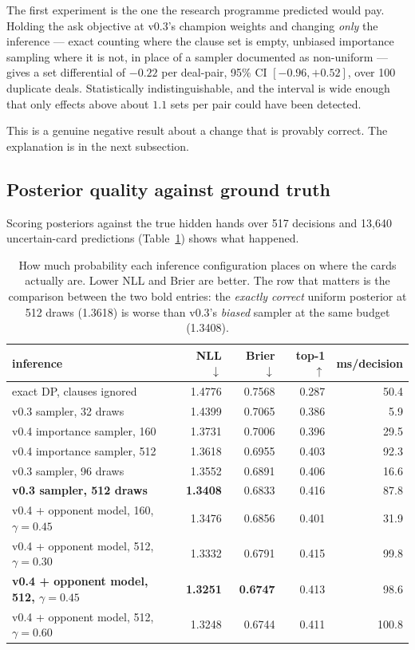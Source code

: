 \documentclass[11pt,a4paper]{article}
\begin{document}
The first experiment is the one the research programme predicted would pay.
Holding the ask objective at v0.3's champion weights and changing \emph{only}
the inference --- exact counting where the clause set is empty, unbiased
importance sampling where it is not, in place of a sampler documented as
non-uniform --- gives a set differential of $-0.22$ per deal-pair,
95\% CI $[-0.96, +0.52]$, over 100 duplicate deals. Statistically
indistinguishable, and the interval is wide enough that only effects above
about $1.1$ sets per pair could have been detected.

This is a genuine negative result about a change that is provably correct. The
explanation is in the next subsection.

\subsection{Posterior quality against ground truth}
\label{sec:res-posterior}

Scoring posteriors against the true hidden hands over 517 decisions and 13{,}640
uncertain-card predictions (Table~\ref{tab:posterior}) shows what happened.

\begin{table}[t]
\centering
\small
\begin{tabular}{lrrrr}
\toprule
inference & NLL $\downarrow$ & Brier $\downarrow$ & top-1 $\uparrow$ & ms/decision \\
\midrule
exact DP, clauses ignored          & 1.4776 & 0.7568 & 0.287 & 50.4 \\
v0.3 sampler, 32 draws             & 1.4399 & 0.7065 & 0.386 & 5.9 \\
v0.4 importance sampler, 160       & 1.3731 & 0.7006 & 0.396 & 29.5 \\
v0.4 importance sampler, 512       & 1.3618 & 0.6955 & 0.403 & 92.3 \\
v0.3 sampler, 96 draws             & 1.3552 & 0.6891 & 0.406 & 16.6 \\
\textbf{v0.3 sampler, 512 draws}   & \textbf{1.3408} & 0.6833 & 0.416 & 87.8 \\
v0.4 + opponent model, 160, $\gamma{=}0.45$ & 1.3476 & 0.6856 & 0.401 & 31.9 \\
v0.4 + opponent model, 512, $\gamma{=}0.30$ & 1.3332 & 0.6791 & 0.415 & 99.8 \\
\textbf{v0.4 + opponent model, 512, $\gamma{=}0.45$} & \textbf{1.3251} & \textbf{0.6747} & 0.413 & 98.6 \\
v0.4 + opponent model, 512, $\gamma{=}0.60$ & 1.3248 & 0.6744 & 0.411 & 100.8 \\
\bottomrule
\end{tabular}
\caption{How much probability each inference configuration places on where the
cards actually are. Lower NLL and Brier are better. The row that matters is the
comparison between the two bold entries: the \emph{exactly correct} uniform
posterior at 512 draws (1.3618) is worse than v0.3's \emph{biased} sampler at
the same budget (1.3408).}
\label{tab:posterior}
\end{table}
\end{document}

